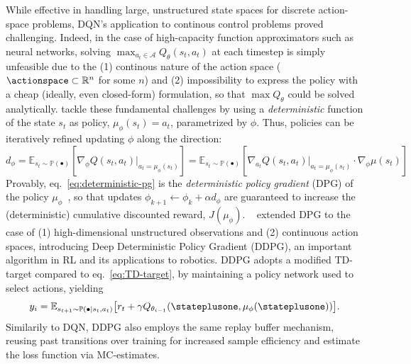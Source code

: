 While effective in handling large, unstructured state spaces for discrete action-space problems, DQN's application to continous control problems proved challenging.
Indeed, in the case of high-capacity function approximators such as neural networks, solving \( \max_{a_t \in \mathcal A} Q_\theta(s_t, a_t) \) at each timestep is simply unfeasible due to the (1) continous nature of the action space (\( \actionspace \subset \mathbb R^n \) for some \( n \)) and (2) impossibility to express the policy with a cheap (ideally, even closed-form) formulation, so that \( \max Q_\theta \) could be solved analytically.
\citet{pmlr-v32-silver14} tackle these fundamental challenges by using a \emph{deterministic} function of the state \( s_t \) as policy, \( \mu_\phi(s_t) = a_t \), parametrized by \( \phi \). Thus, policies can be iteratively refined updating \( \phi \) along the direction:
\begin{equation}\label{eq:deterministic-pg}
    d_\phi = \mathbb E_{s_t \sim \mathbb P (\bullet)} \left[ \nabla_\phi Q(s_t, a_t)\vert_{a_t = \mu_\phi(s_t)} \right] = \mathbb E_{s_t \sim \mathbb P(\bullet)} \left[ \nabla_{a_t} Q(s_t, a_t) \vert_{a_t = \mu_\phi(s_t)} \cdot \nabla_\phi \mu(s_t) \right]
\end{equation}
Provably, eq.~\ref{eq:deterministic-pg} is the \emph{deterministic policy gradient} (DPG) of the policy \(\mu_\phi \)~\citep{pmlr-v32-silver14}, so that updates \( \phi_{k+1}\leftarrow \phi_k + \alpha d_\phi \) are guaranteed to increase the (deterministic) cumulative discounted reward, \( J(\mu_\phi) \).
~\citet{lillicrapContinuousControlDeep2019a} extended DPG to the case of (1) high-dimensional unstructured observations and (2) continuous action spaces, introducing Deep Deterministic Policy Gradient (DDPG), an important algorithm in RL and its applications to robotics.
DDPG adopts a modified TD-target compared to eq.~\ref{eq:TD-target}, by maintaining a policy network used to select actions, yielding
\begin{equation}\label{eq:TD-target-ddpg}
y_i = \mathbb E_{s_{t+1} \sim \mathbb P(\bullet \vert s_t, a_t)} \big[ r_t + \gamma Q_{\theta_{i-1}} (\stateplusone, \mu_\phi(\stateplusone)) \big] .
\end{equation}
Similarily to DQN, DDPG also employs the same replay buffer mechanism, reusing past transitions over training for increased sample efficiency and estimate the loss function via MC-estimates.

